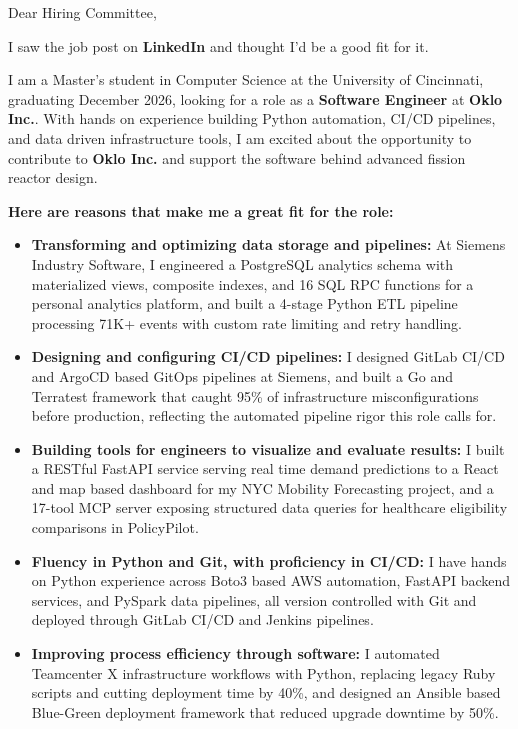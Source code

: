\documentclass[11pt]{letter}
\date{}
\begin{document}
\begin{letter}{}

\opening{Dear Hiring Committee,}

I saw the job post on \textbf{LinkedIn} and thought I'd be a good fit for it.

I am a Master's student in Computer Science at the University of Cincinnati, graduating December 2026, looking for a role as a \textbf{Software Engineer} at \textbf{Oklo Inc.}. With hands on experience building Python automation, CI/CD pipelines, and data driven infrastructure tools, I am excited about the opportunity to contribute to \textbf{Oklo Inc.} and support the software behind advanced fission reactor design.

\textbf{Here are reasons that make me a great fit for the role:}

\begin{itemize}[leftmargin=*, itemsep=0.45em]
    \item \textbf{Transforming and optimizing data storage and pipelines:} At Siemens Industry Software, I engineered a PostgreSQL analytics schema with materialized views, composite indexes, and 16 SQL RPC functions for a personal analytics platform, and built a 4-stage Python ETL pipeline processing 71K+ events with custom rate limiting and retry handling.

    \item \textbf{Designing and configuring CI/CD pipelines:} I designed GitLab CI/CD and ArgoCD based GitOps pipelines at Siemens, and built a Go and Terratest framework that caught 95\% of infrastructure misconfigurations before production, reflecting the automated pipeline rigor this role calls for.

    \item \textbf{Building tools for engineers to visualize and evaluate results:} I built a RESTful FastAPI service serving real time demand predictions to a React and map based dashboard for my NYC Mobility Forecasting project, and a 17-tool MCP server exposing structured data queries for healthcare eligibility comparisons in PolicyPilot.

    \item \textbf{Fluency in Python and Git, with proficiency in CI/CD:} I have hands on Python experience across Boto3 based AWS automation, FastAPI backend services, and PySpark data pipelines, all version controlled with Git and deployed through GitLab CI/CD and Jenkins pipelines.

    \item \textbf{Improving process efficiency through software:} I automated Teamcenter X infrastructure workflows with Python, replacing legacy Ruby scripts and cutting deployment time by 40\%, and designed an Ansible based Blue-Green deployment framework that reduced upgrade downtime by 50\%.
\end{itemize}


\end{letter}
\end{document}
